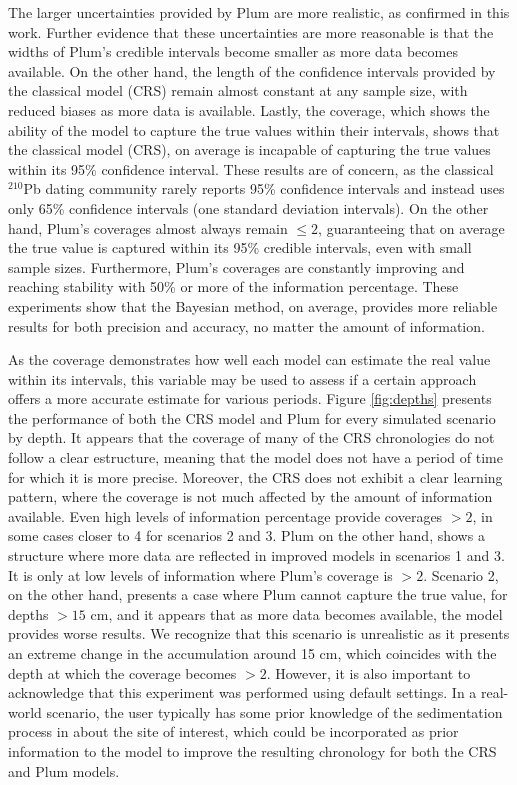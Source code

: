 \documentclass [10pt] {article}
\begin{document}
The larger uncertainties provided by Plum are more realistic, as confirmed in this work.
Further evidence that these uncertainties are more reasonable is that the widths of Plum's credible intervals become smaller as more data becomes available.
On the other hand, the length of the confidence intervals provided by the classical model (CRS) remain almost constant at any sample size, with reduced biases as more data is available.
Lastly, the coverage, which shows the ability of the model to capture the true values within their intervals, shows that the classical model (CRS), on average is incapable of capturing the true values within its 95\% confidence interval. 
These results are of concern, as the classical $^{210}$Pb dating community rarely reports 95\% confidence intervals and instead uses only 65\% confidence intervals (one standard deviation intervals).
On the other hand, Plum's coverages almost always remain $\leq 2$, guaranteeing that on average the true value is captured within its 95\% credible intervals, even with small sample sizes.
Furthermore, Plum's coverages are constantly improving and reaching stability with 50\% or more of the information percentage.
These experiments show that the Bayesian method, on average, provides more reliable results for both precision and accuracy, no matter the amount of information.

As the coverage demonstrates how well each model can estimate the real value within its intervals, this variable may be used to assess if a certain approach offers a more accurate estimate for various periods.
Figure \ref{fig:depths} presents the performance of both the CRS model and Plum for every simulated scenario by depth.
It appears that the coverage of many of the CRS chronologies do not follow a clear estructure, meaning that the model does not have a period of time for which it is more precise. 
Moreover, the CRS does not exhibit a clear learning pattern, where the coverage is not much affected by the amount of information available.
Even high levels of information percentage provide coverages $> 2$, in some cases closer to 4 for scenarios 2 and 3.
Plum on the other hand, shows a structure where more data are reflected in improved models in scenarios 1 and 3.
It is only at low levels of information where Plum's coverage is $>2$.
Scenario 2, on the other hand, presents a case where Plum cannot capture the true value, for depths $>15$ cm, and it appears that as more data becomes available, the model provides worse results. 
We recognize that this scenario is unrealistic as it presents an extreme change in the accumulation around 15 cm, which coincides with the depth at which the coverage becomes $>2$.
However, it is also important to acknowledge that this experiment was performed using default settings.  
In a real-world scenario, the user typically has some prior knowledge of the sedimentation process in about the site of interest, which could be incorporated as prior information to the model to improve the resulting chronology for both the CRS and Plum models.
\end{document}
